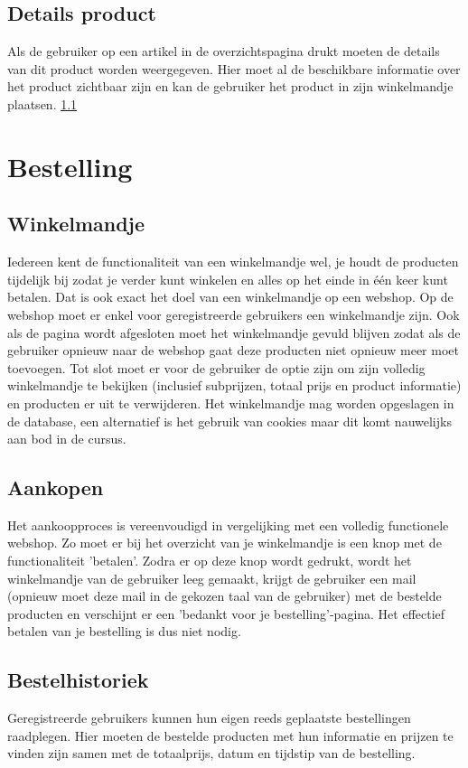 \documentclass{article}
\begin{document}
\subsection{Details product}
\label{subsection:detail_product}
Als de gebruiker op een artikel in de overzichtspagina drukt moeten de details van dit product worden weergegeven. Hier moet al de beschikbare informatie over het product zichtbaar zijn en kan de gebruiker het product in zijn winkelmandje plaatsen. \ref{subsection:winkelmandje}

\section{Bestelling}
\subsection{Winkelmandje}
\label{subsection:winkelmandje}
Iedereen kent de functionaliteit van een winkelmandje wel, je houdt de producten tijdelijk bij zodat je verder kunt winkelen en alles op het einde in één keer kunt betalen. Dat is ook exact het doel van een winkelmandje op een webshop. Op de webshop moet er enkel voor geregistreerde gebruikers een winkelmandje zijn. Ook als de pagina wordt afgesloten moet het winkelmandje gevuld blijven zodat als de gebruiker opnieuw naar de webshop gaat deze producten niet opnieuw meer moet toevoegen. Tot slot moet er voor de gebruiker de optie zijn om zijn volledig winkelmandje te bekijken (inclusief subprijzen, totaal prijs en product informatie) en producten er uit te verwijderen. Het winkelmandje mag worden opgeslagen in de database, een alternatief is het gebruik van cookies maar dit komt nauwelijks aan bod in de cursus.

\subsection{Aankopen}
Het aankoopproces is vereenvoudigd in vergelijking met een volledig functionele webshop. Zo moet er bij het overzicht van je winkelmandje is een knop met de functionaliteit 'betalen'. Zodra er op deze knop wordt gedrukt, wordt het winkelmandje van de gebruiker leeg gemaakt, krijgt de gebruiker een mail (opnieuw moet deze mail in de gekozen taal van de gebruiker) met de bestelde producten en verschijnt er een 'bedankt voor je bestelling'-pagina. Het effectief betalen van je bestelling is dus niet nodig.

\subsection{Bestelhistoriek}
Geregistreerde gebruikers kunnen hun eigen reeds geplaatste bestellingen raadplegen. Hier moeten de bestelde producten met hun informatie en prijzen te vinden zijn samen met de totaalprijs, datum en tijdstip van de bestelling.
\end{document}
